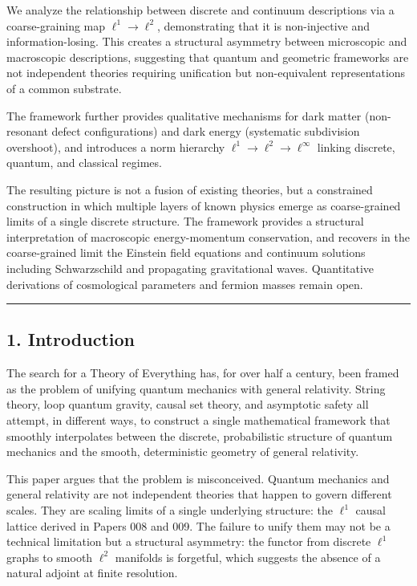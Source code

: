 \documentclass[
]{article}
\begin{document}
We analyze the relationship between discrete and continuum descriptions
via a coarse-graining map \(\ell^1 \to \ell^2\), demonstrating that it
is non-injective and information-losing. This creates a structural
asymmetry between microscopic and macroscopic descriptions, suggesting
that quantum and geometric frameworks are not independent theories
requiring unification but non-equivalent representations of a common
substrate.

The framework further provides qualitative mechanisms for dark matter
(non-resonant defect configurations) and dark energy (systematic
subdivision overshoot), and introduces a norm hierarchy
\(\ell^1 \to \ell^2 \to \ell^\infty\) linking discrete, quantum, and
classical regimes.

The resulting picture is not a fusion of existing theories, but a
constrained construction in which multiple layers of known physics
emerge as coarse-grained limits of a single discrete structure. The
framework provides a structural interpretation of macroscopic
energy-momentum conservation, and recovers in the coarse-grained limit
the Einstein field equations and continuum solutions including
Schwarzschild and propagating gravitational waves. Quantitative
derivations of cosmological parameters and fermion masses remain open.

\begin{center}\rule{0.5\linewidth}{0.5pt}\end{center}

\hypertarget{introduction}{%
\subsection{1. Introduction}\label{introduction}}

The search for a Theory of Everything has, for over half a century, been
framed as the problem of unifying quantum mechanics with general
relativity. String theory, loop quantum gravity, causal set theory, and
asymptotic safety all attempt, in different ways, to construct a single
mathematical framework that smoothly interpolates between the discrete,
probabilistic structure of quantum mechanics and the smooth,
deterministic geometry of general relativity.

This paper argues that the problem is misconceived. Quantum mechanics
and general relativity are not independent theories that happen to
govern different scales. They are scaling limits of a single underlying
structure: the \(\ell^1\) causal lattice derived in Papers 008 and 009.
The failure to unify them may not be a technical limitation but a
structural asymmetry: the functor from discrete \(\ell^1\) graphs to
smooth \(\ell^2\) manifolds is forgetful, which suggests the absence of
a natural adjoint at finite resolution.
\end{document}
